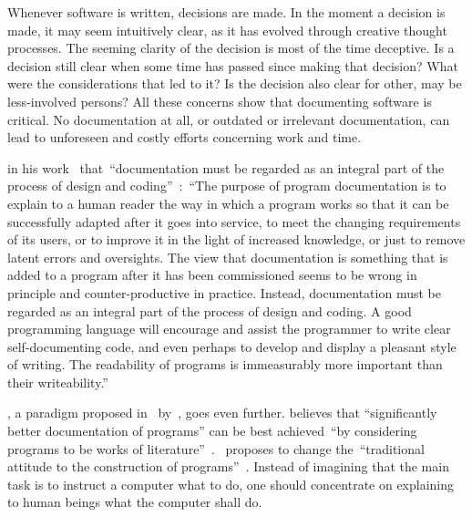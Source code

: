 \documentclass[%
    a4paper,    %
    justified,  %
    nobib,      %
    openany     %
]{tufte-book}
\begin{document}
 Whenever software is written,
decisions are made. In the moment a decision is made, it may seem intuitively
clear, as it has evolved through creative thought processes. The seeming clarity
of the decision is most of the time deceptive. Is a decision still clear when
some time has passed since making that decision? What were the considerations
that led to it? Is the decision also clear for other, may be less-involved
persons? All these concerns show that documenting software is critical. No
documentation at all, or outdated or irrelevant documentation, can lead to
unforeseen and costly efforts concerning work and time.

 in his
work~ that~\enquote{documentation must be regarded as
an integral part of the process of design and coding}~\cite[p.
195]{hoare-hpl-1973}:~\enquote{The purpose of program documentation is to
explain to a human reader the way in which a program works so that it can be
successfully adapted after it goes into service, to meet the changing
requirements of its users, or to improve it in the light of increased knowledge,
or just to remove latent errors and oversights. The view that documentation is
something that is added to a program after it has been commissioned seems to be
wrong in principle and counter-productive in practice. Instead, documentation
must be regarded as an integral part of the process of design and coding. A good
programming language will encourage and assist the programmer to write clear
self-documenting code, and even perhaps to develop and display a pleasant style
of writing. The readability of programs is immeasurably more important than
their writeability.}~\cite[p. 195]{hoare-hpl-1973}

, a paradigm proposed
in~\citeyear{knuth-lp-1984} by~, goes even further.
 believes that \enquote{significantly better
documentation of programs} can be best achieved~\enquote{by considering programs
to be works of literature}~\cite[p.
1]{knuth-lp-1984}.~ proposes to change
the~\enquote{traditional attitude to the construction of programs}~\cite[p.
1]{knuth-lp-1984}. Instead of imagining that the main task is to instruct a
computer what to do, one should concentrate on explaining to human beings what
the computer shall do.~\cite[p. 1]{knuth-lp-1984}
\end{document}
